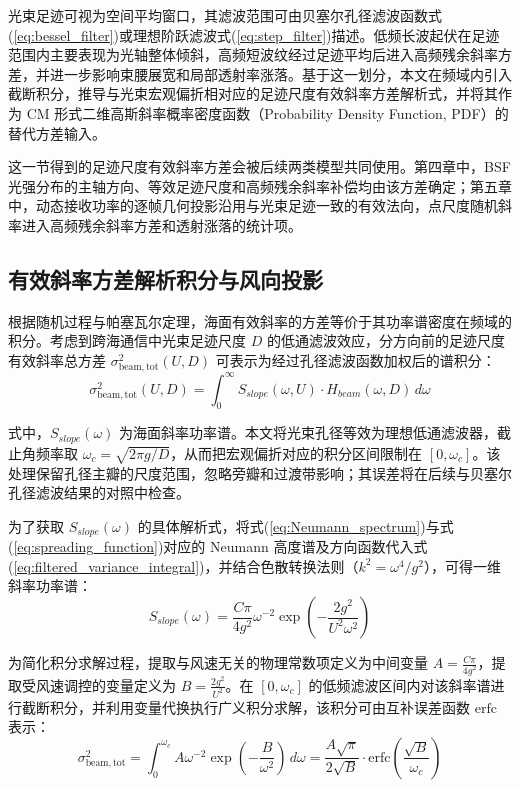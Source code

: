 光束足迹可视为空间平均窗口，其滤波范围可由贝塞尔孔径滤波函数式(\ref{eq:bessel_filter})或理想阶跃滤波式(\ref{eq:step_filter})描述。低频长波起伏在足迹范围内主要表现为光轴整体倾斜，高频短波纹经过足迹平均后进入高频残余斜率方差，并进一步影响束腰展宽和局部透射率涨落。基于这一划分，本文在频域内引入截断积分，推导与光束宏观偏折相对应的足迹尺度有效斜率方差解析式，并将其作为 CM 形式二维高斯斜率概率密度函数（Probability Density Function, PDF）的替代方差输入。

这一节得到的足迹尺度有效斜率方差会被后续两类模型共同使用。第四章中，BSF 光强分布的主轴方向、等效足迹尺度和高频残余斜率补偿均由该方差确定；第五章中，动态接收功率的逐帧几何投影沿用与光束足迹一致的有效法向，点尺度随机斜率进入高频残余斜率方差和透射涨落的统计项。

\subsection{有效斜率方差解析积分与风向投影}

根据随机过程与帕塞瓦尔定理，海面有效斜率的方差等价于其功率谱密度在频域的积分。考虑到跨海通信中光束足迹尺度 $D$ 的低通滤波效应，分方向前的足迹尺度有效斜率总方差 $\sigma_{\mathrm{beam},\mathrm{tot}}^2(U,D)$ 可表示为经过孔径滤波函数加权后的谱积分：
\begin{equation}
	\sigma_{\mathrm{beam},\mathrm{tot}}^2(U,D) = \int_{0}^{\infty} S_{slope}(\omega,U) \cdot H_{beam}(\omega,D) \, d\omega
	\label{eq:filtered_variance_integral}
\end{equation}

式中，$S_{slope}(\omega)$ 为海面斜率功率谱。本文将光束孔径等效为理想低通滤波器，截止角频率取 $\omega_c = \sqrt{2\pi g / D}$，从而把宏观偏折对应的积分区间限制在 $[0,\omega_c]$。该处理保留孔径主瓣的尺度范围，忽略旁瓣和过渡带影响；其误差将在后续与贝塞尔孔径滤波结果的对照中检查。

为了获取 $S_{slope}(\omega)$ 的具体解析式，将式(\ref{eq:Neumann_spectrum})与式(\ref{eq:spreading_function})对应的 Neumann 高度谱及方向函数代入式(\ref{eq:filtered_variance_integral})，并结合色散转换法则（$k^2 = \omega^4/g^2$），可得一维斜率功率谱：
\begin{equation}
	S_{slope}(\omega) = \frac{C \pi}{4 g^2} \omega^{-2} \exp\left( -\frac{2g^2}{U^2 \omega^2} \right)
	\label{eq:1d_slope_spectrum}
\end{equation}

为简化积分求解过程，提取与风速无关的物理常数项定义为中间变量 $A = \frac{C \pi}{4 g^2}$，提取受风速调控的变量定义为 $B = \frac{2g^2}{U^2}$。在 $[0, \omega_c]$ 的低频滤波区间内对该斜率谱进行截断积分，并利用变量代换执行广义积分求解，该积分可由互补误差函数 $\mathrm{erfc}$ 表示：
\begin{equation}
	\sigma_{\mathrm{beam},\mathrm{tot}}^2 = \int_{0}^{\omega_c} A \omega^{-2} \exp\left(-\frac{B}{\omega^2}\right) \, d\omega = \frac{A \sqrt{\pi}}{2\sqrt{B}} \cdot \mathrm{erfc}\left( \frac{\sqrt{B}}{\omega_c} \right)
	\label{eq:variance_erfc_exact}
\end{equation}


